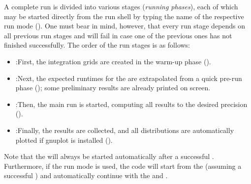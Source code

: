 \documentclass[english,11pt]{article}
\begin{document}
A complete run is divided into various stages ({\it running phases}), each of which may be started directly from the run shell by typing 
the name of the respective run mode (). One must bear in mind, however, that every run stage depends on all 
previous run stages and will fail in case one of the previous ones has not finished successfully. The order of the run stages is as follows: 
\begin{itemize}
\item \gridrun{}:\quad First, the integration grids are created in the warm-up phase ().
\item \premainrun{}:\quad Next, the expected runtimes for the \mainrun{} are extrapolated from a quick pre-run 
phase (); some preliminary results are already printed on screen. 
\item \mainrun{}:\quad Then, the main run is started, computing all results to the desired precision ().
\item \resultrun{}:\quad Finally, the results are collected, and all distributions are automatically plotted if gnuplot is installed ().
\end{itemize}
Note that the \resultrun{} will always be started automatically after a successful \mainrun{}. 
Furthermore, if the run mode  is used, the code will start 
from the \premainrun{} (assuming a successful \gridrun{}) and automatically 
continue with the \mainrun{} and \resultrun{}.
\end{document}
